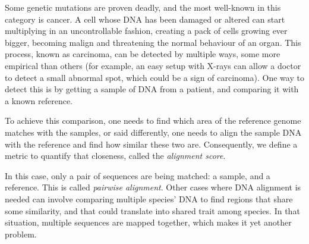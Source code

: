 Some genetic mutations are proven deadly, and the most well-known in this category is cancer. A cell whose DNA has been damaged or altered can start multiplying in an uncontrollable fashion, creating a pack of cells growing ever bigger, becoming malign and threatening the normal behaviour of an organ. This process, known as carcinoma, can be detected by multiple ways, some more empirical than others (for example, an easy setup with X-rays can allow a doctor to detect a small abnormal spot, which could be a sign of carcinoma). One way to detect this is by getting a sample of DNA from a patient, and comparing it with a known reference.

To achieve this comparison, one needs to find which area of the reference genome matches with the samples, or said differently, one needs to align the sample DNA with the reference and find how similar these two are. Consequently, we define a metric to quantify that closeness, called the \emph{alignment score}.

In this case, only a pair of sequences are being matched: a sample, and a reference. This is called \emph{pairwise alignment}. Other cases where DNA alignment is needed can involve comparing multiple species' DNA to find regions that share some similarity, and that could translate into shared trait among species. In that situation, multiple sequences are mapped together, which makes it yet another problem.